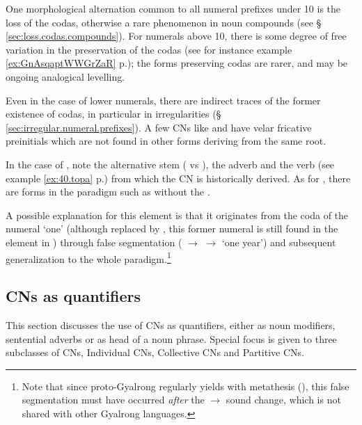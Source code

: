 One morphological alternation common to all numeral prefixes under 10 is the loss of the codas, otherwise a rare phenomenon in noun compounds (see § \ref{sec:loss.codas.compounds}). For numerals above 10, there is some degree of free variation in the preservation of the codas (see for instance example \ref{ex:GnAsqaptWWGrZaR} p.\pageref{ex:GnAsqaptWWGrZaR}); the forms preserving codas are rarer, and may be ongoing analogical levelling.

Even in the case of lower numerals, there are indirect traces of the former existence of codas, in particular in irregularities (§ \ref{sec:irregular.numeral.prefixes}). A few CNs like  and  have velar fricative preinitials  which are not found in other forms deriving from the same root. 

In the case of , note the alternative stem  ( vs ), the adverb  and the verb   (see example \ref{ex:40.topa} p.\pageref{ex:40.topa}) from which the CN  is historically derived. As for , there are forms in the paradigm such as  without the . 

A possible explanation for this  element is that it originates from the coda of the numeral `one' (although replaced by , this former numeral is still found in the element  in ) through false segmentation ( $\rightarrow$  $\rightarrow$  `one year') and subsequent generalization to the whole paradigm.\footnote{Note that since proto-Gyalrong  regularly yields  with metathesis (\citealt[272]{jacques04these}), this false segmentation must have occurred \textit{after} the  $\rightarrow$ sound change, which is not shared with other Gyalrong languages. }


\subsection{CNs as quantifiers} \label{sec:CN.quantifier}
This section discusses the use of CNs as quantifiers, either as noun modifiers, sentential adverbs or as head of a noun phrase. Special focus is given to three subclasses of CNs, Individual CNs, Collective CNs and Partitive CNs.

